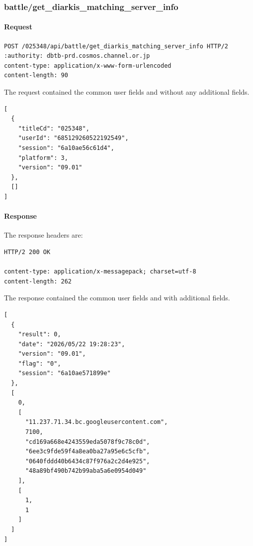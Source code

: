 \subsubsection{battle/get\_diarkis\_matching\_server\_info}
\label{subsec:api_battle_get_diarkis_matching_server_info}

\paragraph{Request}

\begin{lstlisting}
POST /025348/api/battle/get_diarkis_matching_server_info HTTP/2
:authority: dbtb-prd.cosmos.channel.or.jp
content-type: application/x-www-form-urlencoded
content-length: 90
\end{lstlisting}

The request contained the common user fields and without any additional fields.

\begin{lstlisting}
[
  {
    "titleCd": "025348",
    "userId": "685129260522192549",
    "session": "6a10ae56c61d4",
    "platform": 3,
    "version": "09.01"
  },
  []
]
\end{lstlisting}

\newpage

\paragraph{Response}

The response headers are:

\begin{lstlisting}
HTTP/2 200 OK

content-type: application/x-messagepack; charset=utf-8
content-length: 262
\end{lstlisting}

The response contained the common user fields and with additional fields.

\begin{lstlisting}
[
  {
    "result": 0,
    "date": "2026/05/22 19:28:23",
    "version": "09.01",
    "flag": "0",
    "session": "6a10ae571899e"
  },
  [
    0,
    [
      "11.237.71.34.bc.googleusercontent.com",
      7100,
      "cd169a668e4243559eda5078f9c78c0d",
      "6ee3c9fde59f4a8ea0ba27a95e6c5cfb",
      "0640fddd40b6434c87f976a2c2d4e925",
      "48a89bf490b742b99aba5a6e0954d049"
    ],
    [
      1,
      1
    ]
  ]
]
\end{lstlisting}

